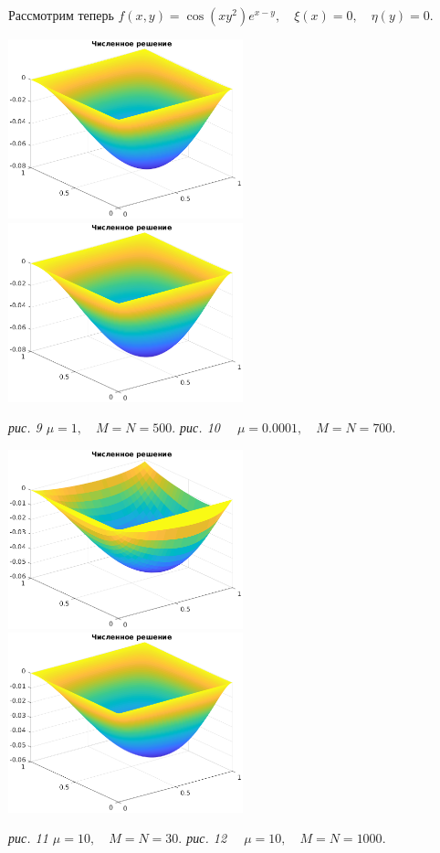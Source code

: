 \documentclass[11pt]{article}
\begin{document}
\newpage
Рассмотрим теперь $f(x, y) = \cos(xy^2)e^{x-y}, \quad \xi(x) = 0, \quad \eta(y) = 0$. 

\noindent
\includegraphics[width=0.51\textwidth]{some5.eps}
\includegraphics[width=0.51\textwidth]{some6.eps}
\begin{center}
\it{рис. 9 \quad $\mu = 1, \quad M = N = 500.$ \qquad \qquad \qquad \qquad  рис. 10 $\quad \mu = 0.0001, \quad M = N = 700.$}
\end{center}

\noindent
\includegraphics[width=0.51\textwidth]{some7.eps}
\includegraphics[width=0.51\textwidth]{some8.eps}
\begin{center}
\it{рис. 11 \quad $\mu = 10, \quad M = N = 30.$ \qquad \qquad \qquad \qquad  рис. 12 $\quad \mu = 10, \quad M = N = 1000.$}
\end{center}
\end{document}
